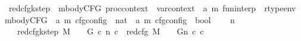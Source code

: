 \begin{isabellebody}
\ red{\isacharunderscore}{\kern0pt}cfg{\isacharunderscore}{\kern0pt}k{\isacharunderscore}{\kern0pt}step\ {\isacharcolon}{\kern0pt}{\isacharcolon}{\kern0pt}\ {\isachardoublequoteopen}mbodyCFG\ proc{\isacharunderscore}{\kern0pt}context\ {\isasymRightarrow}\ var{\isacharunderscore}{\kern0pt}context\ {\isasymRightarrow}\ {\isacharparenleft}{\kern0pt}{\isacharprime}{\kern0pt}a{\isacharcomma}{\kern0pt}\ {\isacharprime}{\kern0pt}m{\isacharparenright}{\kern0pt}\ fun{\isacharunderscore}{\kern0pt}interp\ {\isasymRightarrow}\ rtype{\isacharunderscore}{\kern0pt}env\ {\isasymRightarrow}\ mbodyCFG\ {\isasymRightarrow}\ {\isacharparenleft}{\kern0pt}{\isacharprime}{\kern0pt}a{\isacharcomma}{\kern0pt}\ {\isacharprime}{\kern0pt}m{\isacharparenright}{\kern0pt}\ cfg{\isacharunderscore}{\kern0pt}config\ {\isasymRightarrow}\ nat\ {\isasymRightarrow}\ {\isacharparenleft}{\kern0pt}{\isacharprime}{\kern0pt}a{\isacharcomma}{\kern0pt}\ {\isacharprime}{\kern0pt}m{\isacharparenright}{\kern0pt}\ cfg{\isacharunderscore}{\kern0pt}config\ {\isasymRightarrow}\ bool{\isachardoublequoteclose}\isanewline
\ \ {\isacharparenleft}{\kern0pt}{\isachardoublequoteopen}{\isacharunderscore}{\kern0pt}{\isacharcomma}{\kern0pt}{\isacharunderscore}{\kern0pt}{\isacharcomma}{\kern0pt}{\isacharunderscore}{\kern0pt}{\isacharcomma}{\kern0pt}{\isacharunderscore}{\kern0pt}{\isacharcomma}{\kern0pt}{\isacharunderscore}{\kern0pt}\ {\isasymturnstile}{\isacharunderscore}{\kern0pt}\ {\isacharminus}{\kern0pt}n{\isasymrightarrow}{\isacharcircum}{\kern0pt}{\isacharunderscore}{\kern0pt}{\isacharslash}{\kern0pt}\ {\isacharunderscore}{\kern0pt}{\isachardoublequoteclose}\ {\isacharbrackleft}{\kern0pt}{}{\isacharcomma}{\kern0pt}{}{\isacharcomma}{\kern0pt}{}{\isacharcomma}{\kern0pt}{}{\isacharbrackright}{\kern0pt}\ {}{}{\isacharparenright}{\kern0pt}\isanewline
\ \ \ {\isachardoublequoteopen}red{\isacharunderscore}{\kern0pt}cfg{\isacharunderscore}{\kern0pt}k{\isacharunderscore}{\kern0pt}step\ M\ {\isasymLambda}\ {\isasymGamma}\ {\isasymOmega}\ G\ c{}\ n\ c{}\ {\isasymequiv}\ {\isacharparenleft}{\kern0pt}{\isacharparenleft}{\kern0pt}red{\isacharunderscore}{\kern0pt}cfg\ M\ {\isasymLambda}\ {\isasymGamma}\ {\isasymOmega}\ G{\isacharparenright}{\kern0pt}{\isacharcircum}{\kern0pt}{\isacharcircum}{\kern0pt}n{\isacharparenright}{\kern0pt}\ c{}\ c{}{\isachardoublequoteclose}\isanewline
\isanewline
{}\isamarkupfalse%
\ \ \isanewline
\isanewline
\isanewline
\isanewline
{}\isamarkupfalse%

\end{isabellebody}
